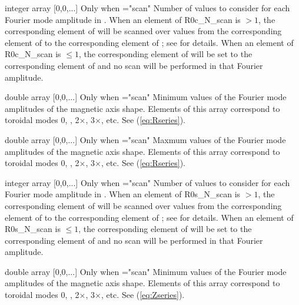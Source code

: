 {integer array}
{[0,0,...]}
{Only when ={\ttfamily "scan"}}
{Number of values to consider for each Fourier mode amplitude in . When an element of {\ttfamily R0c\_N\_scan} is $>1$, the corresponding element of  will be scanned over  values from the corresponding element of  to the corresponding element of ; see  for details.  When an element of {\ttfamily R0c\_N\_scan} is $\le 1$, the corresponding element of  will be set to the corresponding element of  and no scan will be performed in that Fourier amplitude.
}

\myhrule

{double array}
{[0,0,...]}
{Only when ={\ttfamily "scan"}}
{Minimum values of the Fourier mode amplitudes of the magnetic axis shape. Elements of this array correspond to toroidal modes 0, , 2$\times$, 3$\times$, etc.  See (\ref{eq:Rseries}).
}

\myhrule

{double array}
{[0,0,...]}
{Only when ={\ttfamily "scan"}}
{Maxmum values of the Fourier mode amplitudes of the magnetic axis shape. Elements of this array correspond to toroidal modes 0, , 2$\times$, 3$\times$, etc.  See (\ref{eq:Rseries}).
}

\myhrule

{integer array}
{[0,0,...]}
{Only when ={\ttfamily "scan"}}
{Number of values to consider for each Fourier mode amplitude in . When an element of {\ttfamily R0s\_N\_scan} is $>1$, the corresponding element of  will be scanned over  values from the corresponding element of  to the corresponding element of ; see  for details.  When an element of {\ttfamily R0s\_N\_scan} is $\le 1$, the corresponding element of  will be set to the corresponding element of  and no scan will be performed in that Fourier amplitude.
}

\myhrule

{double array}
{[0,0,...]}
{Only when ={\ttfamily "scan"}}
{Minimum values of the Fourier mode amplitudes of the magnetic axis shape. Elements of this array correspond to toroidal modes 0, , 2$\times$, 3$\times$, etc.  See (\ref{eq:Zseries}).
}

